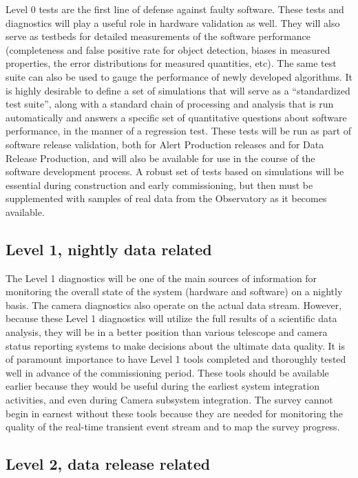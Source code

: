\documentclass[SE,toc,lsstdraft]{lsstdoc}
\begin{document}
Level 0 tests are the first line of defense against faulty software. These tests and diagnostics will
play a useful role in hardware validation as well.  They will also serve
as testbeds for detailed measurements of the software performance (completeness
and false positive rate for object detection, biases in measured properties, the error
distributions for measured quantities, etc). The same test suite can also be used to gauge
the performance of newly developed algorithms. It is highly desirable to define a set
of simulations that will serve as a ``standardized test suite'', along with a standard chain of processing
and analysis that is run automatically and answers a specific set of quantitative questions
about software performance, in the manner of a regression test.  These tests will be run as part of software release validation, both for Alert Production releases and for Data Release Production, and will also be available for use in the course of the software development process.  A robust set of tests based on simulations will be essential during construction and early commissioning, but then must be supplemented with samples of real data from the Observatory as it becomes available.


\subsection{Level 1, nightly data related}

The Level 1 diagnostics will be one of the main sources of information for monitoring
the overall state of the system (hardware and software) on a nightly basis.
The camera diagnostics also operate on the actual data stream. However, because these Level 1 diagnostics
will utilize the full results of a scientific data analysis, they will be
in a better position than various telescope and camera status reporting systems to
make decisions about the ultimate data quality. It is of paramount importance to
have Level 1 tools completed and thoroughly tested well in advance of the commissioning
period. These tools should be available earlier because they would be useful during the earliest system
integration activities, and even during Camera subsystem integration. The survey cannot begin in earnest
without these tools because they are needed for monitoring the quality of the real-time transient event
stream and to map the survey progress.


\subsection{Level 2, data release related}
\end{document}
